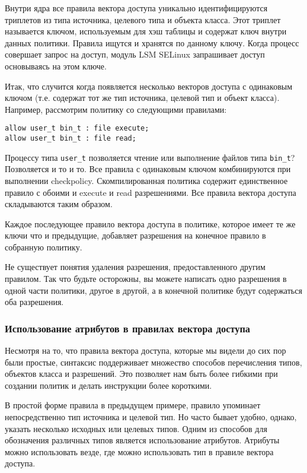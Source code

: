 \documentclass{./../class/UIR}
\begin{document}
	Внутри ядра все правила вектора доступа уникально идентифицируются триплетов из
	типа источника, целевого типа и объекта класса. Этот триплет называется ключом,
	используемым для хэш таблицы и содержат ключ внутри данных политики. Правила
	ищутся и хранятся по данному ключу. Когда процесс совершает запрос на доступ,
	модуль LSM SELinux запрашивает доступ основываясь на этом ключе.

	Итак, что случится когда появляется несколько векторов доступа с одинаковым
	ключом (т.е. содержат тот же тип источника, целевой тип и объект класса).
	Например, рассмотрим политику со следующими правилами:

\begin{verbatim}
allow user_t bin_t : file execute;
allow user_t bin_t : file read;
\end{verbatim}

	Процессу типа \verb"user_t" позволяется чтение или выполнение файлов типа
	\verb"bin_t"? Позволяется и то и то. Все правила с одинаковым ключом
	комбинируются при выполнении checkpolicy. Скомпилированная политика содержит
	единственное правило с обоими и execute и read разрешениями. Все правила
	вектора доступа складываются таким образом.

	Каждое последующее правило вектора доступа в политике, которое имеет те же
	ключи что и предыдущие, добавляет разрешения на конечное правило в собранную
	политику.

	Не существует понятия удаления разрешения, предоставленного другим правилом.
	Так что будьте осторожны, вы можете написать одно разрешения в одной части
	политики, другое в другой, а в конечной политике будут содержаться оба
	разрешения.

\subsubsection{Использование атрибутов в правилах вектора доступа}

	Несмотря на то, что правила вектора доступа, которые мы видели до сих пор были
	простые, синтаксис поддерживает множество способов перечисления типов, объектов
	класса и разрешений. Это позволяет нам быть более гибкими при создании политик
	и делать инструкции более короткими.

	В простой форме правила в предыдущем примере, правило упоминает непосредственно
	тип источника и целевой тип. Но часто бывает удобно, однако,  указать несколько
	исходных или целевых типов. Одним из способов для обозначения различных типов
	является использование атрибутов. Атрибуты можно использовать везде, где можно
	использовать тип в правиле вектора доступа.
\end{document}
